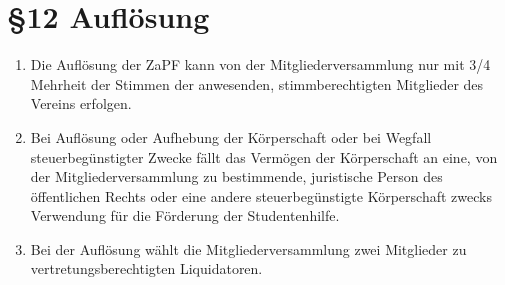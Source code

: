 \documentclass[ngerman]{article}
\begin{document}
\section*{§12 Auflösung}
\begin{enumerate}
 \item Die Auflösung der ZaPF kann von der Mitgliederversammlung nur mit 3/4 Mehrheit der Stimmen der anwesenden, stimmberechtigten Mitglieder des Vereins erfolgen.
 \item Bei Auflösung oder Aufhebung der Körperschaft oder bei Wegfall steuerbegünstigter Zwecke fällt das Vermögen der Körperschaft an eine, von der Mitgliederversammlung zu bestimmende, juristische Person des öffentlichen Rechts oder eine andere steuerbegünstigte Körperschaft zwecks Verwendung für die Förderung der Studentenhilfe.
 \item Bei der Auflösung wählt die Mitgliederversammlung zwei Mitglieder zu vertretungsberechtigten Liquidatoren.
\end{enumerate}
\end{document}
